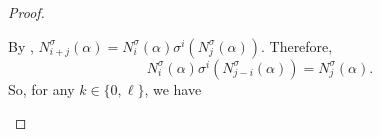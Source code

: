 \documentclass[12pt,paper]{article}
\theoremstyle{plain}
\begin{document}
\begin{proof}
\begin{itemize}
By \cite[Proposition 2.1]{Cherchem2016},  
$
N_{i+j}^\sigma(\alpha) = N_i^\sigma(\alpha)\sigma^i(N_j^\sigma(\alpha)).
$
Therefore, 
$$ N_i^\sigma(\alpha) \sigma^i(N_{j-i}^\sigma(\alpha))= N_j^{\sigma}(\alpha) .$$ 
So, for any $k\in \{ 0, \ell\}$, we have 


\end{itemize}
\end{proof}
\end{document}
